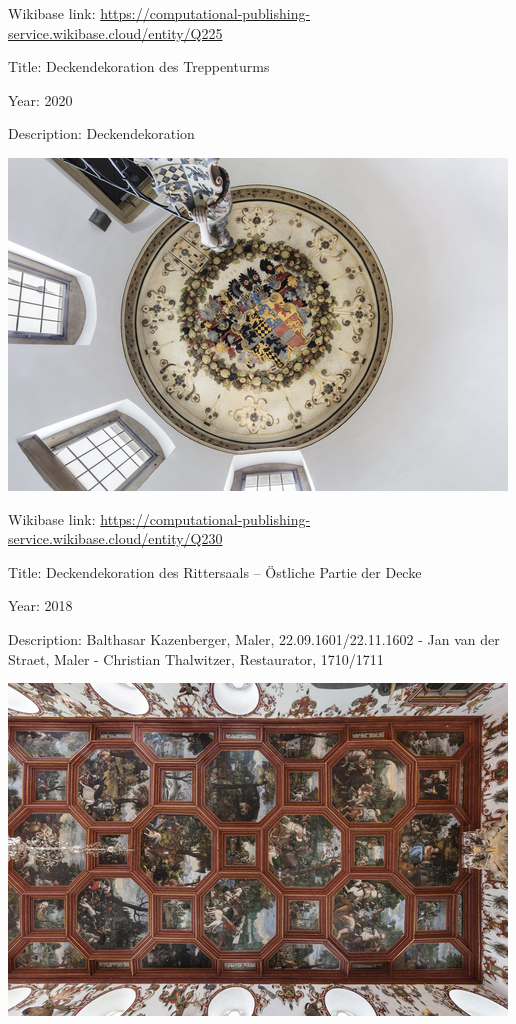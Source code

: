 \documentclass[
  letterpaper,
]{book}
\begin{document}
Wikibase link:
\url{https://computational-publishing-service.wikibase.cloud/entity/Q225}

Title: Deckendekoration des Treppenturms

Year: 2020

Description: Deckendekoration

\includegraphics{paintings_files/figure-pdf/cell-3-output-18.png}

Wikibase link:
\url{https://computational-publishing-service.wikibase.cloud/entity/Q230}

Title: Deckendekoration des Rittersaals -- Östliche Partie der Decke

Year: 2018

Description: Balthasar Kazenberger, Maler, 22.09.1601/22.11.1602 - Jan
van der Straet, Maler - Christian Thalwitzer, Restaurator, 1710/1711

\includegraphics{paintings_files/figure-pdf/cell-3-output-20.png}
\end{document}
